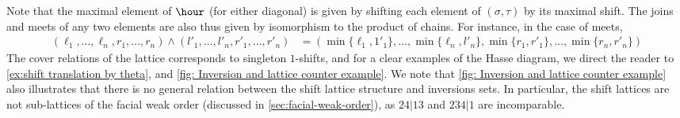\documentclass{amsart}
\theoremstyle{definition}
\begin{document}
Note that the maximal element of $\hour$ (for either diagonal) is given by shifting each element of $(\sigma,\tau)$ by its maximal shift.
The joins and meets of any two elements are also thus given by isomorphism to the product of chains.
For instance, in the case of meets,
{\small
\begin{align*}
	(\ell_1,\ldots,\ell_n,r_1,\ldots,r_n)\land (l'_1,\ldots,l'_n,r'_1,\ldots,r'_n) &= (\min\{\ell_1,1'_1\},\ldots,\min\{\ell_n,l'_n\},\min\{r_1,r'_1\},\ldots,\min\{r_n,r'_n\})
\end{align*}
}
The cover relations of the lattice corresponds to singleton $1$-shifts, and for a clear examples of the Hasse diagram, we direct the reader to \cref{ex:shift translation by theta}, and \cref{fig: Inversion and lattice counter example}.
We note that \cref{fig: Inversion and lattice counter example} also illustrates that there is no general relation between the shift lattice structure and inversions sets.
In particular, the shift lattices are not sub-lattices of the facial weak order (discussed in \cref{sec:facial-weak-order}), as $24|13$ and $234|1$ are incomparable.
\end{document}
